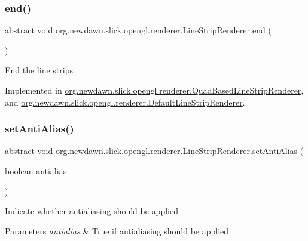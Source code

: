 \subsubsection{\texorpdfstring{end()}{end()}}
{\footnotesize\ttfamily abstract void org.\+newdawn.\+slick.\+opengl.\+renderer.\+Line\+Strip\+Renderer.\+end (\begin{DoxyParamCaption}{ }\end{DoxyParamCaption})\hspace{0.3cm}{\ttfamily [abstract]}}

End the line strips 

Implemented in \mbox{\hyperlink{classorg_1_1newdawn_1_1slick_1_1opengl_1_1renderer_1_1_quad_based_line_strip_renderer_a1d55a722cf80e77c570f29ebe853d1ba}{org.\+newdawn.\+slick.\+opengl.\+renderer.\+Quad\+Based\+Line\+Strip\+Renderer}}, and \mbox{\hyperlink{classorg_1_1newdawn_1_1slick_1_1opengl_1_1renderer_1_1_default_line_strip_renderer_a544d66d8f579f2f5fd3cf62fdf0c4038}{org.\+newdawn.\+slick.\+opengl.\+renderer.\+Default\+Line\+Strip\+Renderer}}.

\mbox{\label{interfaceorg_1_1newdawn_1_1slick_1_1opengl_1_1renderer_1_1_line_strip_renderer_a849fde4a1b5b6981e77978bb3afa2b3b}} 
\subsubsection{\texorpdfstring{set\+Anti\+Alias()}{setAntiAlias()}}
{\footnotesize\ttfamily abstract void org.\+newdawn.\+slick.\+opengl.\+renderer.\+Line\+Strip\+Renderer.\+set\+Anti\+Alias (\begin{DoxyParamCaption}\item[{boolean}]{antialias }\end{DoxyParamCaption})\hspace{0.3cm}{\ttfamily [abstract]}}

Indicate whether antialiasing should be applied


\begin{DoxyParams}{Parameters}
{\em antialias} & True if antialiasing should be applied \\
\hline
\end{DoxyParams}


